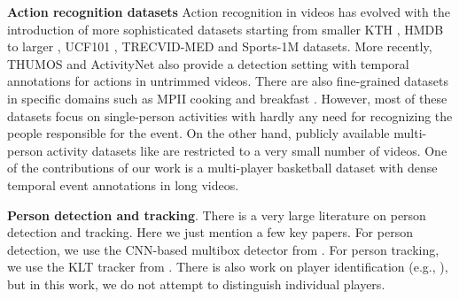 \noindent \textbf{Action recognition datasets}
Action recognition in videos has evolved with the introduction of more
sophisticated datasets starting from smaller KTH \cite{KTH}, HMDB \cite{HMDB}
to larger , UCF101 \cite{UCF101}, TRECVID-MED \cite{MED11} and Sports-1M
\cite{Karpathy_CVPR14} datasets.  More recently, THUMOS \cite{THUMOS} and
ActivityNet \cite{ActivityNet} also provide a detection setting with temporal
annotations for actions in untrimmed videos.  There are also fine-grained
datasets in specific domains such as MPII cooking \cite{Finegrained_cooking}
and breakfast \cite{Breakfast}.  However, most of these datasets focus on
single-person activities with hardly any need for recognizing the people
responsible for the event. On the other hand, publicly available multi-person
activity datasets like \cite{Ryoo_10,Choi_ICCV09,VIRAT} are restricted to a very small
number of videos.  One of the contributions of our work is a multi-player
basketball dataset with dense temporal event annotations in long videos.

\noindent \textbf{Person detection and tracking}. There is a very
large literature on person detection and tracking. Here we just
mention a few key papers.
For person detection, we use the CNN-based multibox detector from
\cite{Szegedy13}.
For person tracking, we use the KLT tracker from
\cite{Veenman_PAMI2001}.
There is also work on player identification (e.g., \cite{Lu2013}), but
in this work, we do not attempt to distinguish individual players.

